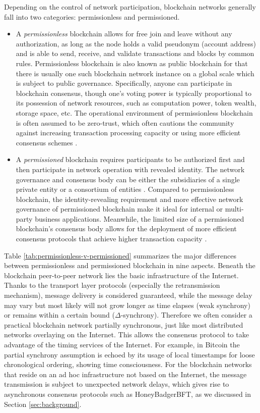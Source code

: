 Depending on the control of network participation, blockchain networks generally fall into two categories: permissionless and permissioned.
\begin{itemize}
    \item A \textit{permissionless} blockchain allows for free join and leave without any authorization, as long as the node holds a valid pseudonym (account address) and is able to send, receive, and validate transactions and blocks by common rules. 
    Permissionless blockchain is also known as public blockchain for that there is usually one such blockchain network instance on a global scale which is subject to public governance.
    Specifically, anyone can participate in blockchain consensus, though one's voting power is typically proportional to its possession of network resources, such as computation power, token wealth, storage space, etc.
    The operational environment of permissionless blockchain is often assumed to be zero-trust, which often cautions the community against increasing transaction processing capacity or using more efficient consensus schemes .
    \item A \textit{permissioned} blockchain requires participants to be authorized first and then participate in network operation with revealed identity. 
    {\color{\rrcolor}
    The network governance and consensus body can be either the subsidiaries of a single private entity or a consortium of entities .
    Compared to permissionless blockchain, the identity-revealing requirement and more effective network governance of permissioned blockchain make it ideal for internal or multi-party business applications. Meanwhile, the limited size of a permissioned blockchain's consensus body} 
    allows for the deployment of more efficient consensus protocols that achieve higher transaction capacity .
\end{itemize}
Table \ref{tab:permissionless-v-permissioned} summarizes the major differences between permissionless and permissioned blockchain in nine aspects.
Beneath the blockchain peer-to-peer network lies the basic infrastructure of the Internet. Thanks to the transport layer protocols (especially the retransmission mechanism), message delivery is considered guaranteed, while the message delay may vary but most likely will not grow longer as time elapses (weak synchrony) or remains within a certain bound ($\Delta$-synchrony). Therefore we often consider a practical blockchain network partially synchronous, just like most distributed networks overlaying on the Internet. This allows the consensus protocol to take advantage of the timing services of the Internet. For example, in Bitcoin the partial synchrony assumption is echoed by its usage of local timestamps for loose chronological ordering, showing time consciousness. For the blockchain networks that reside on an ad hoc infrastructure not based on the Internet, the message transmission is subject to unexpected network delays, which gives rise to asynchronous consensus protocols such as HoneyBadgerBFT, as we discussed in Section \ref{sec:background}.
